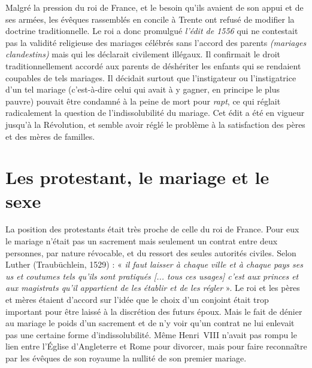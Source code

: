  Malgré la pression du roi de France, et le besoin qu'ils avaient de son appui et de ses armées, les évêques rassemblés en concile à Trente ont refusé de modifier la doctrine traditionnelle. Le roi a donc promulgué \emph{l'édit de 1556} qui ne contestait pas la validité religieuse des mariages célébrés sans l'accord des parents \emph{(mariages clandestins)} mais qui les déclarait civilement illégaux. Il confirmait le droit traditionnellement accordé aux parents de déshériter les enfants qui se rendaient coupables de tels mariages. Il décidait surtout que l'instigateur ou l'instigatrice d'un tel mariage (c'est-à-dire celui qui avait à y gagner, en principe le plus pauvre) pouvait être condamné à la peine de mort pour \emph{rapt}, ce qui réglait radicalement la question de l'indissolubilité du mariage. Cet édit a été en vigueur jusqu'à la Révolution, et semble avoir réglé le problème à la satisfaction des pères et des mères de familles. 
 
 \section{Les protestant, le mariage et le sexe}

 La position des protestants était très proche de celle du roi de France. Pour eux le mariage n'était pas un sacrement mais seulement un contrat entre deux personnes, par nature révocable, et du ressort des seules autorités civiles. Selon Luther (Traubüchlein, 1529) : « \emph{il faut laisser à chaque ville et à chaque pays ses us et coutumes tels qu'ils sont pratiqués \emph{[... tous ces usages]} c'est aux princes et aux magistrats qu'il appartient de les établir et de les régler} ». Le roi et les pères et mères étaient d'accord sur l'idée que le choix d'un conjoint était trop important pour être laissé à la discrétion des futurs époux. Mais le fait de dénier au mariage le poids d'un sacrement et de n'y voir qu'un contrat ne lui enlevait pas une certaine forme d'indissolubilité. Même Henri~VIII n'avait pas rompu le lien entre l'Église d'Angleterre et Rome pour divorcer, mais pour faire reconnaître par les évêques de son royaume la nullité de son premier mariage. 
 
